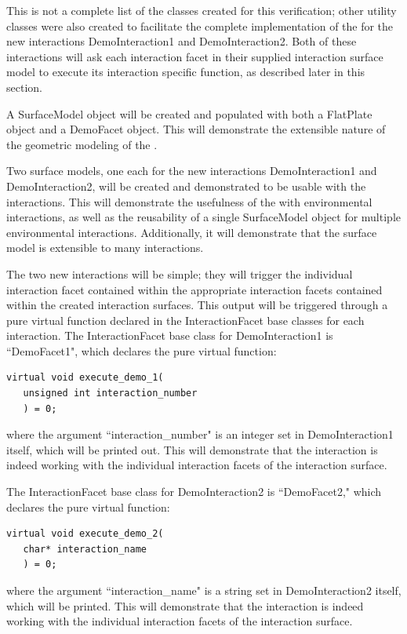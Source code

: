 \begin{description}
This is not a complete list of the classes created for this verification;
other utility classes were also created to facilitate the complete
implementation of the \ModelDesc for the new interactions
DemoInteraction1 and DemoInteraction2. Both of these interactions
will ask each interaction facet in their supplied interaction
surface model to execute its interaction specific function, as described
later in this section.

A SurfaceModel object will be created and populated with both a FlatPlate
object and a DemoFacet object. This will demonstrate the extensible
nature of the geometric modeling of the \ModelDesc.

Two surface models, one each for the new interactions DemoInteraction1
and DemoInteraction2, will be created and demonstrated to be usable
with the interactions. This will demonstrate the usefulness of the
\ModelDesc with environmental interactions, as well as
the reusability of a single SurfaceModel object for multiple
environmental interactions. Additionally, it will demonstrate that
the surface model is extensible to many interactions.

The two new interactions will be simple; they will trigger the individual
interaction facet contained within the appropriate interaction facets
contained within the created interaction surfaces. This output will
be triggered through a pure virtual function declared in the
InteractionFacet base classes for each interaction. The InteractionFacet
base class for DemoInteraction1 is ``DemoFacet1", which declares
the pure virtual function:

\begin{verbatim}
virtual void execute_demo_1(
   unsigned int interaction_number
   ) = 0;
\end{verbatim}

where the argument ``interaction\_number" is an integer set in
DemoInteraction1 itself, which will be printed out. This will
demonstrate that the interaction is indeed working with the individual
interaction facets of the interaction surface.

The InteractionFacet base class for DemoInteraction2 is ``DemoFacet2,"
which declares the pure virtual function:

\begin{verbatim}
virtual void execute_demo_2(
   char* interaction_name
   ) = 0;
\end{verbatim}

where the argument ``interaction\_name" is a string set in
DemoInteraction2 itself, which will be printed. This will
demonstrate that the interaction is indeed working with the
individual interaction facets of the interaction surface.


\end{description}
